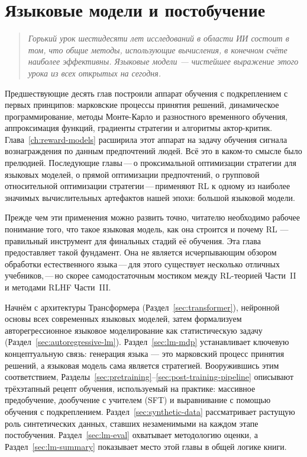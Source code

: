\chapter[Языковые модели и постобучение]{Языковые модели и постобучение}
\label{ch:lm-post-training}

\begin{quote}
\itshape
Горький урок шестидесяти лет исследований в области ИИ состоит в том, что общие методы, использующие вычисления, в конечном счёте наиболее эффективны. Языковые модели --- чистейшее выражение этого урока из всех открытых на сегодня.
\end{quote}

\bigskip

Предшествующие десять глав построили аппарат обучения с подкреплением с первых принципов: марковские процессы принятия решений, динамическое программирование, методы Монте-Карло и разностного временного обучения, аппроксимация функций, градиенты стратегии и алгоритмы актор-критик. Глава~\ref{ch:reward-models} расширила этот аппарат на задачу обучения сигнала вознаграждения по данным предпочтений людей. Всё это в каком-то смысле было прелюдией. Последующие главы\,---\,о проксимальной оптимизации стратегии для языковых моделей, о прямой оптимизации предпочтений, о групповой относительной оптимизации стратегии\,---\,применяют RL к одному из наиболее значимых вычислительных артефактов нашей эпохи: большой языковой модели.

Прежде чем эти применения можно развить точно, читателю необходимо рабочее понимание того, что такое языковая модель, как она строится и почему RL --- правильный инструмент для финальных стадий её обучения. Эта глава предоставляет такой фундамент. Она не является исчерпывающим обзором обработки естественного языка\,---\,для этого существует несколько отличных учебников,\,---\,но скорее самодостаточным мостиком между RL-теорией Части~II и методами RLHF Части~III.

Начнём с архитектуры Трансформера (Раздел~\ref{sec:transformer}), нейронной основы всех современных языковых моделей, затем формализуем авторегрессионное языковое моделирование как статистическую задачу (Раздел~\ref{sec:autoregressive-lm}). Раздел~\ref{sec:lm-mdp} устанавливает ключевую концептуальную связь: генерация языка --- это марковский процесс принятия решений, а языковая модель сама является стратегией. Вооружившись этим соответствием, Разделы~\ref{sec:pretraining}--\ref{sec:post-training-pipeline} описывают трёхэтапный рецепт обучения, используемый на практике: массивное предобучение, дообучение с учителем (SFT) и выравнивание с помощью обучения с подкреплением. Раздел~\ref{sec:synthetic-data} рассматривает растущую роль синтетических данных, ставших незаменимыми на каждом этапе постобучения. Раздел~\ref{sec:lm-eval} охватывает методологию оценки, а Раздел~\ref{sec:lm-summary} показывает место этой главы в общей логике книги.

